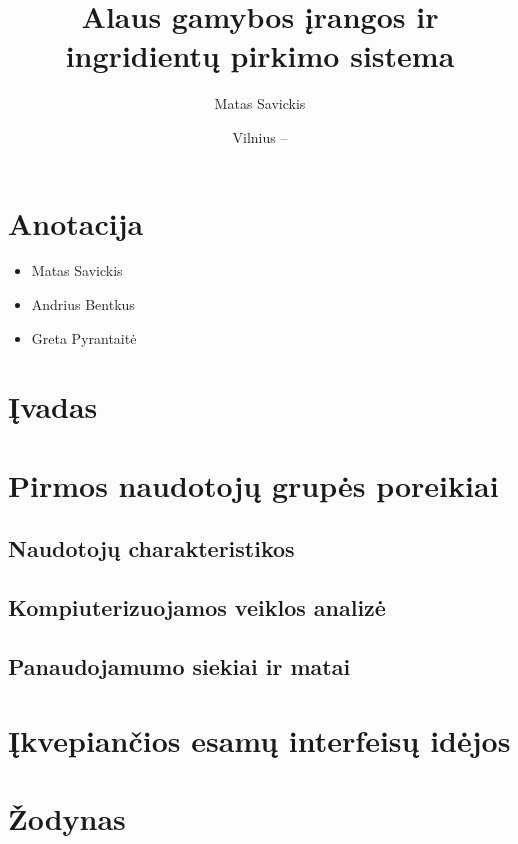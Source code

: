 \documentclass[oneside]{VUMIFPSkursinis}
\title{Alaus gamybos įrangos ir ingridientų pirkimo sistema}
\author{Matas Savickis}
\date{Vilnius – \the\year}
\begin{document}
\maketitle

\section{Anotacija}
\begin{itemize}
	\item{Matas Savickis}
	\item{Andrius Bentkus}
	\item{Greta Pyrantaitė}

\end{itemize}

\tableofcontents

\section{Įvadas}

\section{Pirmos naudotojų grupės poreikiai}
	\subsection{Naudotojų charakteristikos}
	\subsection{Kompiuterizuojamos veiklos analizė}
	\subsection{Panaudojamumo siekiai ir matai}

\section{Įkvepiančios esamų interfeisų idėjos}

\section{Žodynas}
\end{document}
